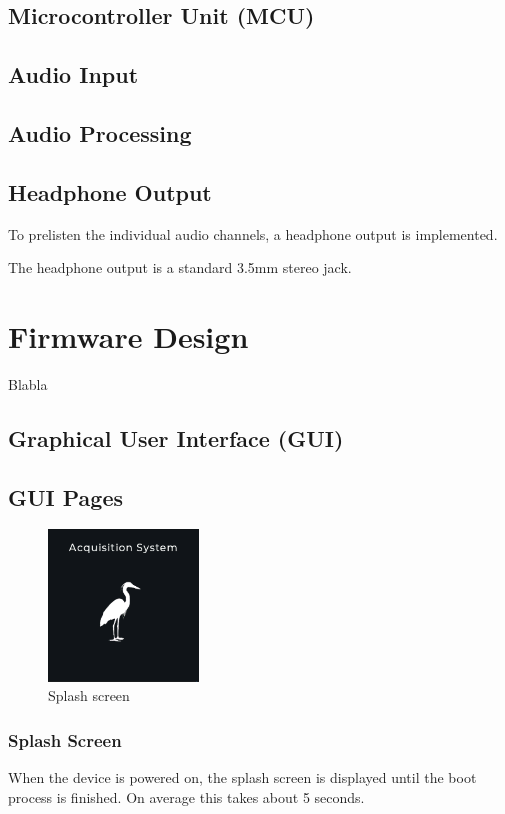 \subsection{Microcontroller Unit (MCU)}



\subsection{Audio Input}

\subsection{Audio Processing}

\subsection{Headphone Output}

To prelisten the individual audio channels, a headphone output is implemented.

The headphone output is a standard 3.5mm stereo jack.



\newpage
\section{Firmware Design}
Blabla

\subsection{Graphical User Interface (GUI)}

\subsection{GUI Pages}

\begin{minipage}{\linewidth}
	\begin{figure}
		\vspace{-0.6cm}
		\includegraphics[width=4cm]{images/4_design_acquisition_system/gui/01_splash_screen.png}
		\centering
		\caption{Splash screen}
		\label{fig:acquisition_system_gui_splash_screen}
	\end{figure}
	\subsubsection{Splash Screen}
	When the device is powered on, the splash screen is displayed until the boot process is finished.
	On average this takes about 5 seconds.
\end{minipage}
\vspace{-0.2cm}



